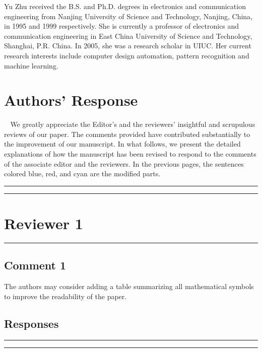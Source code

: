 \documentclass[10pt,journal, compsoc]{IEEEtran}
\begin{document}

\begin{IEEEbiography}{Yu Zhu}
received the B.S. and Ph.D. degrees in electronics and communication engineering from Nanjing University of Science and Technology, Nanjing, China, in 1995 and 1999 respectively. She is currently a professor of electronics and communication engineering in East China University of Science and Technology, Shanghai, P.R. China. In 2005, she was a research scholar in UIUC. Her current research interests include computer design automation, pattern recognition and machine learning.
\end{IEEEbiography}

\clearpage



\section*{Authors' Response}
$~~~~$We greatly appreciate the Editor's and the reviewers' insightful and scrupulous reviews of our paper. The comments provided have contributed substantially to the improvement of our manuscript. In what follows, we present the detailed explanations of how the manuscript has been revised to respond to the comments of the associate editor and the reviewers. In the previous pages, the sentences colored blue, red, and cyan are the modified parts.


\noindent\rule[0.25\baselineskip]{252pt}{1pt}
\noindent\rule[0.25\baselineskip]{252pt}{1pt}

\section*{Reviewer 1}

\noindent\rule[0.25\baselineskip]{252pt}{1pt}

\subsection*{Comment 1}
The authors may consider adding a table summarizing all mathematical symbols to improve the readability of the paper.

\subsection*{Responses}


\noindent\rule[0.25\baselineskip]{252pt}{1pt}
\noindent\rule[0.25\baselineskip]{252pt}{1pt}
\end{document}
